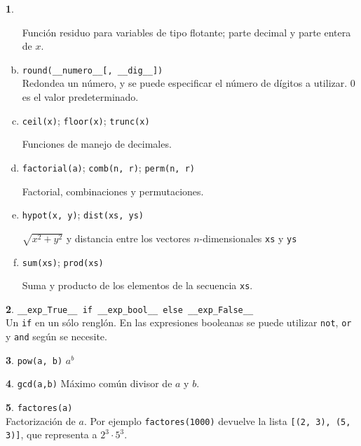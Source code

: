 \documentclass[12pt]{article}
\theoremstyle{definition}
\newtheorem{funcion}{}[section]
\begin{document}
\begin{funcion}
\begin{enumerate}[a)]
      Funci\'on residuo para variables de tipo flotante; parte decimal y parte entera de $x$.

\item \verb|round(__numero__[, __dig__])| \\[1ex]
  Redondea un n\'umero, y se puede especificar el n\'umero de d\'igitos a utilizar. 0 es el valor predeterminado.

    \item \verb|ceil(x)|;
      \verb|floor(x)|;
      \verb|trunc(x)|

      Funciones de manejo de decimales.

    \item \verb|factorial(a)|; \verb|comb(n, r)|; \verb|perm(n, r)|

      Factorial, combinaciones y permutaciones.

    \item \verb|hypot(x, y)|; \verb|dist(xs, ys)|

      $\sqrt{x^2+y^2}$ y distancia entre los vectores $n$-dimensionales  \verb|xs| y \verb|ys|

    \item \verb|sum(xs)|; \verb|prod(xs)|

      Suma y producto de los elementos de la secuencia \verb|xs|.

  \end{enumerate}
\end{funcion}

\begin{funcion} \verb|__exp_True__ if __exp_bool__ else __exp_False__| \\[1ex]
  Un \verb|if| en un s\'olo rengl\'on. En las expresiones booleanas se puede utilizar \verb|not|, \verb|or| y \verb|and| seg\'un se necesite.
\end{funcion}

\begin{funcion}
  \verb|pow(a, b)| \quad
  $a^b$
\end{funcion}

\begin{funcion}
  \verb|gcd(a,b)| \quad
  M\'aximo com\'un divisor de $a$ y $b$.
\end{funcion}

\begin{funcion}
  \verb|factores(a)| \\[1ex]
  Factorizaci\'on de $a$. Por ejemplo \verb|factores(1000)| devuelve la lista \verb|[(2, 3), (5, 3)]|, que representa a $2^3\cdot 5^3$.
\end{funcion}
\end{document}
